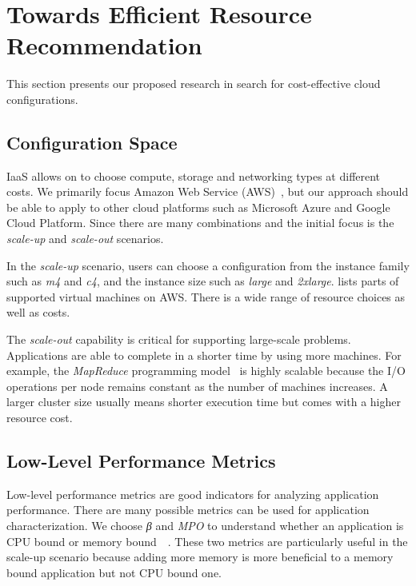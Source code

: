 \section{Towards Efficient Resource Recommendation}
\label{sec:future_work}

This section presents our proposed research in search for
cost-effective cloud configurations.

\subsection{Configuration Space}
IaaS allows on to choose compute, storage and networking types
at different costs.
We primarily focus Amazon Web Service (AWS)~\cite{AmazonEC2}, but
our approach should be able to apply to other cloud platforms such as
Microsoft Azure and Google Cloud Platform.
Since there are many combinations and
the initial focus is
the \emph{scale-up} and \emph{scale-out} scenarios.

In the \emph{scale-up} scenario, users can choose a configuration from
the instance family such as \emph{m4} and \emph{c4},
and
the instance size such as \emph{large} and \emph{2xlarge}.
\mytable{\ref{tab:ec2_types}} lists parts of supported virtual machines on AWS.
There is a wide range of resource choices as well as costs.



The \emph{scale-out} capability is critical for supporting large-scale problems.
Applications are able to complete in a shorter time by using
more machines.
For example, the \emph{MapReduce} programming model~\cite{DeanJ2004_MapReduce}
is highly scalable
because the I/O operations per node remains constant
as the number of machines increases.
A larger cluster size usually means shorter execution time but
comes with a higher resource cost.


\subsection{Low-Level Performance Metrics}

Low-level performance metrics are good indicators for
analyzing application performance.
There are many possible metrics can be used for application characterization.
We choose \emph{β} and \emph{MPO} to understand whether an application
is CPU bound or memory bound~~\cite{Freeh2007}.
These two metrics are particularly useful in the scale-up scenario
because adding more memory is more beneficial to a memory bound application
but not CPU bound one.

